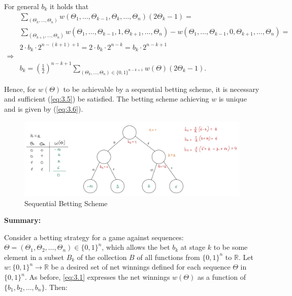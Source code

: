 \documentclass[11pt]{article}
\numberwithin{equation}{section}
\theoremstyle{boldStyle}
\begin{document}
\bigbreak

For general $b_k$ it holds that
\begin{align*}
    &\sum_{(\Theta_k, \ldots, \Theta_n)} w(\Theta_1, \ldots, \Theta_{k-1}, \Theta_{k}, \ldots, \Theta_n) (2\Theta_k - 1) = \\
    &\sum_{(\Theta_{k+1}, \ldots, \Theta_n)} w(\Theta_1, \ldots, \Theta_{k-1}, 1, \Theta_{k+1}, \ldots, \Theta_n) - w(\Theta_1, \ldots, \Theta_{k-1}, 0, \Theta_{k+1}, \ldots, \Theta_n)  = \\
    &2 \cdot b_k \cdot 2^{n-(k+1)+1} = 2 \cdot b_k \cdot 2^{n-k} = b_k \cdot 2^{n-k+1}
    \\ \Longrightarrow \\
    &b_k = \left(\frac{1}{2}\right)^{n-k+1} \sum_{(\Theta_k, \ldots, \Theta_n) \in \{0, 1\}^{n-k+1}} w(\Theta)(2\Theta_k - 1).
\end{align*}

\bigbreak

Hence, for $w(\Theta)$ to be achievable by a sequential betting scheme, it is necessary and sufficient (\ref{eq:3.5}) be satisfied.
The betting scheme achieving \(w\) is unique and is given by (\ref{eq:3.6}).

\begin{figure}[H]
    \centering
    \includegraphics[width=\textwidth]{figs/achievable_winning.jpeg}
    \caption{Sequential Betting Scheme}
\end{figure}


\bigbreak

\textbf{Summary:}


Consider a betting strategy for a game against sequences: $\Theta = (\Theta_1, \Theta_2, \ldots, \Theta_n) \in \{0,1\}^n$, which allows the bet $b_k$ at stage $k$ to be some 
element in a subset $B_k$ of the collection $B$ of all functions from $\{0,1\}^n$ to $\mathbb{R}$. 
Let $w: \{0,1\}^n \rightarrow \mathbb{R}$ be a desired set of net winnings defined for each sequence $\Theta$ in $\{0,1\}^n$. 
As before, \ref{eq:3.1} expresses the net winnings $w(\Theta)$ as a function of $\{b_1, b_2, \ldots, b_n\}$. Then:
\end{document}
